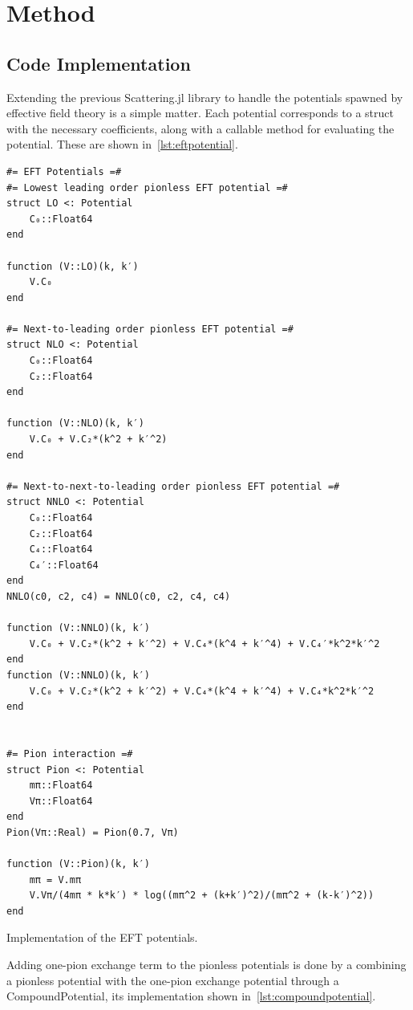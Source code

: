 \section{Method}\label{sec:Method}


\subsection{Code Implementation}
Extending the previous \textsf{Scattering.jl} library to handle the potentials
spawned by effective field theory is a simple matter. Each potential corresponds
to a struct with the necessary coefficients, along with a callable method for
evaluating the potential. These are shown in~\cref{lst:eftpotential}.


\begin{listing}
\begin{verbatim}
#= EFT Potentials =#
#= Lowest leading order pionless EFT potential =#
struct LO <: Potential
    C₀::Float64
end

function (V::LO)(k, k′)
    V.C₀
end

#= Next-to-leading order pionless EFT potential =#
struct NLO <: Potential
    C₀::Float64
    C₂::Float64
end

function (V::NLO)(k, k′)
    V.C₀ + V.C₂*(k^2 + k′^2)
end

#= Next-to-next-to-leading order pionless EFT potential =#
struct NNLO <: Potential
    C₀::Float64
    C₂::Float64
    C₄::Float64
    C₄′::Float64
end
NNLO(c0, c2, c4) = NNLO(c0, c2, c4, c4)

function (V::NNLO)(k, k′)
    V.C₀ + V.C₂*(k^2 + k′^2) + V.C₄*(k^4 + k′^4) + V.C₄′*k^2*k′^2
end
function (V::NNLO)(k, k′)
    V.C₀ + V.C₂*(k^2 + k′^2) + V.C₄*(k^4 + k′^4) + V.C₄*k^2*k′^2
end


#= Pion interaction =#
struct Pion <: Potential
    mπ::Float64
    Vπ::Float64
end
Pion(Vπ::Real) = Pion(0.7, Vπ)

function (V::Pion)(k, k′)
    mπ = V.mπ
    V.Vπ/(4mπ * k*k′) * log((mπ^2 + (k+k′)^2)/(mπ^2 + (k-k′)^2))
end

\end{verbatim}
\caption{Implementation of the EFT potentials.\label{lst:eftpotential}}
\end{listing}

Adding one-pion exchange term to the pionless potentials is done by a combining
a pionless potential with the one-pion exchange potential through a
\textsf{CompoundPotential}, its implementation shown in~\cref{lst:compoundpotential}.


